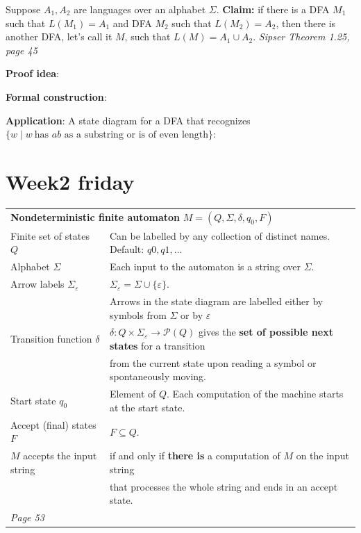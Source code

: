 \documentclass[12pt, oneside]{article}
\begin{document}
\newpage

Suppose $A_1, A_2$ are languages over an alphabet $\Sigma$.
{\bf Claim:} if there is a DFA $M_1$ such that $L(M_1) = A_1$ and 
DFA $M_2$ such that $L(M_2) = A_2$, then there is another DFA, let's call it $M$, such that 
$L(M) = A_1 \cup A_2$.  {\it Sipser Theorem 1.25, page 45}

{\bf Proof idea}:


{\bf Formal construction}: 

\vspace{70pt}

{\bf Application}: A state diagram for a DFA that recognizes $\{w \mid w~\text{has $ab$ as a substring or is of even length} \}$:

\vspace{100pt}
 \vfill
\section*{Week2 friday}



\begin{center}
\begin{tabular}{|ll|}
\hline
\multicolumn{2}{|l|}{{\bf Nondeterministic finite automaton} $M = (Q, \Sigma, \delta, q_0, F)$} \\
Finite set of states $Q$  & Can  be labelled by any collection  of distinct names. Default: $q0, q1, \ldots$  \\
Alphabet $\Sigma$ &  Each input to the automaton is a string over  $\Sigma$. \\
Arrow labels $\Sigma_\varepsilon$ &  $\Sigma_\varepsilon = \Sigma \cup \{ \varepsilon\}$. \\
&  Arrows 
in the state diagram are labelled either by symbols from $\Sigma$ or by $\varepsilon$ \\
Transition function $\delta$  & $\delta: Q \times \Sigma_{\varepsilon} \to \mathcal{P}(Q)$
gives the {\bf set of possible next states} for a transition \\
&  from the current state upon reading a symbol or spontaneously moving.\\
Start state $q_0$ & Element of $Q$.  Each computation of the machine starts at the  start  state.\\
Accept (final) states $F$ & $F \subseteq  Q$.\\
$M$ accepts the input string & if and only if {\bf there is} a computation of $M$ on the input string\\
&  that 
processes the whole string and ends in an
accept state.\\
\hline
{\it Page 53}& \\
\hline
\end{tabular}
\end{center}
\end{document}
